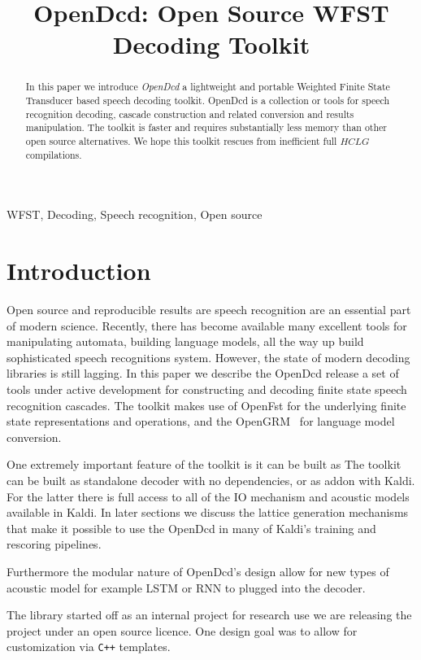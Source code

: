 \documentclass{article}
\title{OpenDcd: Open Source WFST Decoding Toolkit}
\begin{document}
%
\maketitle
%
\begin{abstract}
In this paper we introduce \emph{OpenDcd} a lightweight and portable Weighted Finite State
Transducer based speech decoding toolkit. OpenDcd is a collection or tools for speech
recognition decoding, cascade construction and related conversion and results manipulation.
The toolkit is faster and requires substantially less memory than other open source alternatives.
We hope this toolkit rescues from inefficient full $HCLG$ compilations.
\end{abstract}
%
\begin{keywords}
WFST, Decoding, Speech recognition, Open source
\end{keywords}
%
\section{Introduction}
\label{sec:intro}
Open source and reproducible results are speech recognition are an essential
part of modern science. Recently, there has become available many excellent
tools for manipulating automata, building language models, all the way up
build sophisticated speech recognitions system.  However, the state of modern 
decoding libraries is still lagging. In this paper we describe the OpenDcd
release a set of tools under active development for constructing and decoding
finite state speech recognition cascades. The toolkit makes use of OpenFst for the 
underlying finite state representations
and operations, and the OpenGRM~\cite{roark12} for language model conversion.

One extremely important feature of the toolkit is it can be built as 
The toolkit can be built as standalone decoder with no dependencies, or as addon
with Kaldi. For the latter there is full access to all of the IO mechanism and 
acoustic models available in Kaldi. In later sections we discuss the lattice generation
mechanisms that make it possible to use the OpenDcd in many of Kaldi's training and
rescoring pipelines. 

Furthermore the modular nature of OpenDcd's  design allow for new types of 
acoustic model for example LSTM or RNN to plugged into the decoder. 

The library started off as an internal project for research use we are
releasing the project under an open source licence. One design goal was 
to allow for customization via \texttt{C++} templates.
\end{document}
